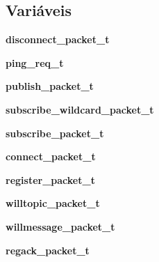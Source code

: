 \subsection*{Variáveis}
\begin{DoxyCompactItemize}
\item 
\hypertarget{group__Pacotes_ga1bdd22cd8ef2662e484e03ebdae7c970}{{\bfseries disconnect\+\_\+packet\+\_\+t}}\label{group__Pacotes_ga1bdd22cd8ef2662e484e03ebdae7c970}

\item 
\hypertarget{group__Pacotes_gaaa5b26ddb66cc7e85a9f4b30881775f2}{{\bfseries ping\+\_\+req\+\_\+t}}\label{group__Pacotes_gaaa5b26ddb66cc7e85a9f4b30881775f2}

\item 
\hypertarget{group__Pacotes_ga1f5bdda25ae963bb270e8a301b201b51}{{\bfseries publish\+\_\+packet\+\_\+t}}\label{group__Pacotes_ga1f5bdda25ae963bb270e8a301b201b51}

\item 
\hypertarget{group__Pacotes_gad20a7c29debd43f1bb693ea71cf25f37}{{\bfseries subscribe\+\_\+wildcard\+\_\+packet\+\_\+t}}\label{group__Pacotes_gad20a7c29debd43f1bb693ea71cf25f37}

\item 
\hypertarget{group__Pacotes_gad1653d1eb1e0b157ee553f5e18e837e3}{{\bfseries subscribe\+\_\+packet\+\_\+t}}\label{group__Pacotes_gad1653d1eb1e0b157ee553f5e18e837e3}

\item 
\hypertarget{group__Pacotes_gac7e9bb2727332431de0ed82739b64a37}{{\bfseries connect\+\_\+packet\+\_\+t}}\label{group__Pacotes_gac7e9bb2727332431de0ed82739b64a37}

\item 
\hypertarget{group__Pacotes_ga504f9ba055b5a5a51a852c85ba691d2f}{{\bfseries register\+\_\+packet\+\_\+t}}\label{group__Pacotes_ga504f9ba055b5a5a51a852c85ba691d2f}

\item 
\hypertarget{group__Pacotes_ga10d9b05d37a49ef4473051eb8cd9062e}{{\bfseries willtopic\+\_\+packet\+\_\+t}}\label{group__Pacotes_ga10d9b05d37a49ef4473051eb8cd9062e}

\item 
\hypertarget{group__Pacotes_ga498ec637bb31754407eaf35a3c0b3b4b}{{\bfseries willmessage\+\_\+packet\+\_\+t}}\label{group__Pacotes_ga498ec637bb31754407eaf35a3c0b3b4b}

\item 
\hypertarget{group__Pacotes_ga35c8d1d4849e06b6cd1a59b1d86b8368}{{\bfseries regack\+\_\+packet\+\_\+t}}\label{group__Pacotes_ga35c8d1d4849e06b6cd1a59b1d86b8368}


\end{DoxyCompactItemize}
